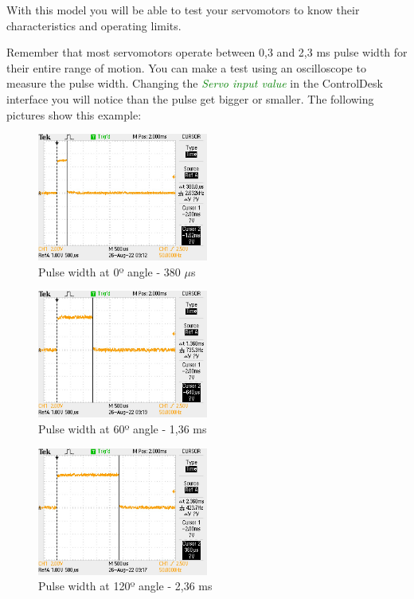 With this model you will be able to test your servomotors to know their characteristics and operating limits.\par
Remember that most servomotors operate between 0,3 and 2,3 ms pulse width for their entire range of motion.
You can make a test using an oscilloscope to measure the pulse width.
Changing the \textcolor{green}{\textit{Servo input value}} in the ControlDesk interface you will notice than the pulse get bigger or smaller.
The following pictures show this example:
    \begin{figure}[H]
        \centering
        \includegraphics[width=0.5\textwidth]{Images/Servo_Pulse_Time/0.png}
        \caption{Pulse width at 0º angle - 380 $\mu$s}
        \label{fig38}
    \end{figure}
    \begin{figure}[H]
        \centering
        \includegraphics[width=0.5\textwidth]{Images/Servo_Pulse_Time/60.png}
        \caption{Pulse width at 60º angle - 1,36 ms}
        \label{fig39}
    \end{figure}
    \begin{figure}[H]
        \centering
        \includegraphics[width=0.5\textwidth]{Images/Servo_Pulse_Time/120.png}
        \caption{Pulse width at 120º angle - 2,36 ms}
        \label{fig40}
    \end{figure}

